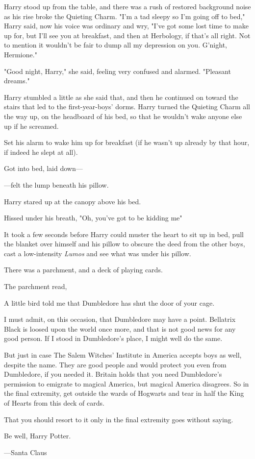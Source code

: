 Harry stood up from the table, and there was a rush of restored background
noise as his rise broke the Quieting Charm. "I'm a tad sleepy so I'm going off
to bed," Harry said, now his voice was ordinary and wry, "I've got some lost
time to make up for, but I'll see you at breakfast, and then at Herbology, if
that's all right. Not to mention it wouldn't be fair to dump all my depression
on you. G'night, Hermione."

"Good night, Harry," she said, feeling very confused and alarmed. "Pleasant
dreams."

Harry stumbled a little as she said that, and then he continued on toward the
stairs that led to the first-year-boys' dorms.
\sbreak
Harry turned the Quieting Charm all the way up, on the headboard of his bed, so
that he wouldn't wake anyone else up if he screamed.

Set his alarm to wake him up for breakfast (if he wasn't up already by that
hour, if indeed he slept at all).

Got into bed, laid down---

---felt the lump beneath his pillow.

Harry stared up at the canopy above his bed.

Hissed under his breath, "Oh, you've got to be kidding me{\el}"

It took a few seconds before Harry could muster the heart to sit up in bed,
pull the blanket over himself and his pillow to obscure the deed from the other
boys, cast a low-intensity \emph{Lumos} and see what was under his pillow.

There was a parchment, and a deck of playing cards.

The parchment read,

\begin{writtenNote}
A little bird told me that Dumbledore has shut the door of your cage.

I must admit, on this occasion, that Dumbledore may have a point.
Bellatrix Black is loosed upon the world once more, and that is not good news
for any good person. If I stood in Dumbledore's place, I might well do the
same.

But just in case{\el} The Salem Witches' Institute in America accepts
boys as well, despite the name. They are good people and would protect you even
from Dumbledore, if you needed it. Britain holds that you need Dumbledore's
permission to emigrate to magical America, but magical America disagrees. So in
the final extremity, get outside the wards of Hogwarts and tear in half the
King of Hearts from this deck of cards.

That you should resort to it only in the final extremity goes without
saying.

Be well, Harry Potter.

---Santa Claus
\end{writtenNote}

